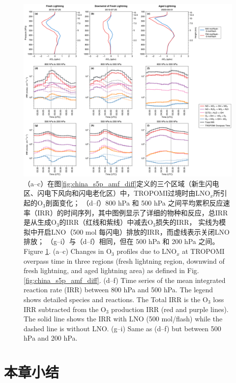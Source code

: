 \begin{figure}[h]
    \includegraphics[width=16cm]{./figures/irr_timeseries.png}
    \caption{
    （a--c）在图\ref{fig:china_s5p_amf_diff}定义的三个区域（新生闪电区、闪电下风向和闪电老化区）中，TROPOMI过境时由LNO$_x$所引起的O$_3$剖面变化；
    （d--f）800 hPa 和 500 hPa 之间平均累积反应速率（IRR）的时间序列，其中图例显示了详细的物种和反应，总IRR是从生成O$_3$的IRR（红线和紫线）中减去O$_3$损失的IRR，
     实线为模拟中开启LNO（500 mol 每闪电）排放的IRR，而虚线表示关闭LNO排放；
    （g--i）与（d--f）相同，但在 500 hPa 和 200 hPa 之间。\\
    Figure \ref{fig:irr_timeseries}. (a--c) Changes in O$_3$ profiles due to LNO$_x$ at TROPOMI overpass time in three regions (fresh lightning region, downwind of fresh lightning, and aged lightning area) as defined in Fig. \ref{fig:china_s5p_amf_diff}.
    (d--f) Time series of the mean integrated reaction rate (IRR) between 800 hPa and 500 hPa.
    The legend shows detailed species and reactions.
    The Total IRR is the O$_3$ loss IRR subtracted from the O$_3$ production IRR (red and purple lines).
    The solid line shows the IRR with LNO (500 mol/flash) while the dashed line is without LNO.
    (g--i) Same as (d--f) but between 500 hPa and 200 hPa.
    }
    \label{fig:irr_timeseries}
\end{figure}

\section{本章小结}


